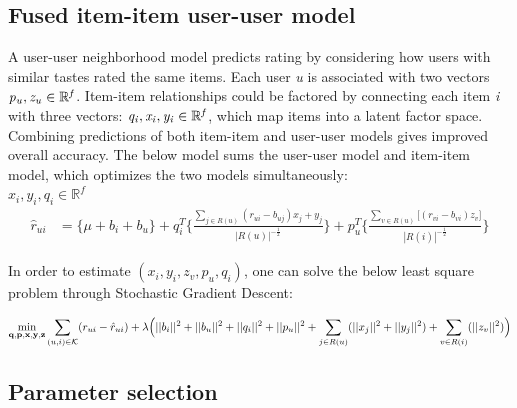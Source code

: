 \documentclass[11pt]{article}
\theoremstyle{definition}
\begin{document}
\subsection{Fused item-item user-user model}
A user-user neighborhood model predicts rating by considering how users with similar tastes rated the same items. Each user \textit{u} is associated with two vectors $\it {p_u, z_u} \in \mathbb{R}^f$.
Item-item relationships could be factored by connecting each item \textit{i} with three vectors: $\it{q_i, x_i, y_i}\in \mathbb{R}^f$, which map items into a latent factor space. Combining predictions of both item-item and user-user models gives improved overall accuracy. The below model sums the user-user model and item-item model, which optimizes the two models simultaneously:\\

$x_i, y_i, q_i \in \mathbb{R}^f$
\begin{align*}
\hat{r}_{ui} & = 
\bigg\{  \mu + b_i + b_u  \bigg\} + 
q_i^T 
\bigg\{ \frac{\sum_{j \in R(u)} (r_{ui} - b_{uj}) x_j +  y_j }
{|R(u)|^{-\frac{1}{2}}} \bigg\} + 
p_u^T
\bigg\{ 
\frac{\sum_{v \in R(u)} \big[ (r_{vi} - b_{vi}) z_v \big] }{|R(i)|^{-\frac{1}{2}}}
\bigg\}
\end{align*}

In order to estimate $(x_i,y_i,z_v,p_u,q_i)$, one can solve the below least square problem through Stochastic Gradient Descent:

\begin{align*}
\min_{{\bf q}, {\bf p}, {\bf x}, {\bf y}, {\bf z}} \sum_{(u, i) \in {\cal K}} (r_{ui} - \hat{r}_{ui}) + \lambda \Big(  ||b_i||^2 + ||b_u||^2 + ||q_i||^2 + ||p_u||^2 + 
\sum_{j \in R(u)} (||x_j||^2 + ||y_j||^2) +
\sum_{v \in R(i)} (||z_v||^2)  \Big)
\end{align*}


\subsection{Parameter selection}
\end{document}
